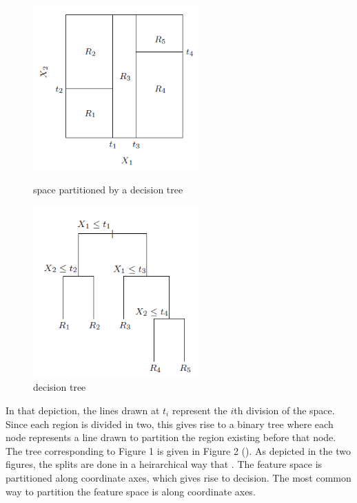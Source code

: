 \documentclass[12pt]{article}
\begin{document}
\begin{figure}[b!]
\centering
\begin{minipage}{0.45\textwidth}
\centering
\includegraphics[width=2.5in]{partition}
\caption{space partitioned by a decision tree}
\end{minipage}\hfill
\begin{minipage}{0.45\textwidth}
\centering
\includegraphics[width=2.5in]{dectree}
\caption{decision tree}
\end{minipage}
\end{figure}

 In that depiction, the lines drawn at $t_i$ represent the $i$th division of the space. Since each region is divided in two, this gives rise to a binary tree where each node represents a line drawn to partition the region existing before that node. The tree corresponding to Figure 1 is given in Figure 2 (\cite{HTF}). As depicted in the two figures, the splits are done in a heirarchical way that . The feature space is partitioned along coordinate axes, which gives rise to decision. The most common way to partition the feature space is along coordinate axes. 
\end{document}
